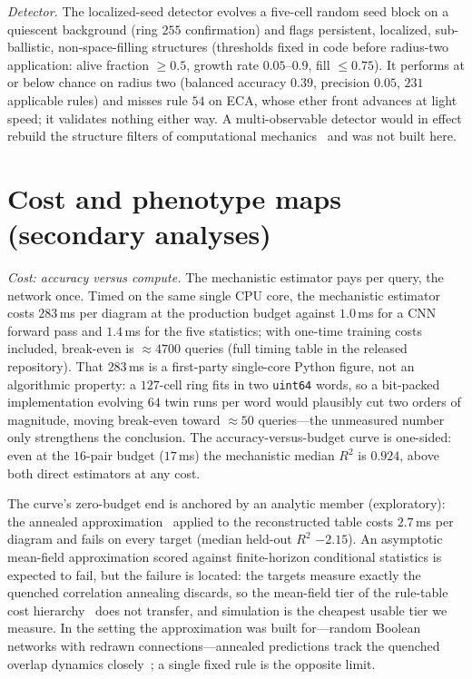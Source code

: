 \documentclass[aip,cha,amsmath,amssymb,reprint,floatfix]{revtex4-2}
\newcommand{\rtwo}{$R^2$}
\begin{document}
\emph{Detector.} The localized-seed detector evolves a five-cell random seed
block on a
quiescent background (ring $255$ confirmation) and flags persistent, localized,
sub-ballistic, non-space-filling structures (thresholds fixed in code before
radius-two application: alive fraction $\ge0.5$, growth rate $0.05$--$0.9$,
fill $\le0.75$). It performs at or below chance on radius two (balanced
accuracy $0.39$, precision $0.05$, $231$ applicable rules) and misses rule
$54$ on ECA, whose ether front advances at light speed; it validates nothing
either way. A multi-observable detector would in effect rebuild the structure
filters of computational mechanics~\cite{shalizi2006} and was not built
here.

\section{Cost and phenotype maps (secondary analyses)}
\label{app:secondary}

\emph{Cost: accuracy versus compute.} The mechanistic estimator pays per
query, the network once. Timed on the same single CPU core, the mechanistic
estimator costs $283$\,ms per diagram at the production budget against
$1.0$\,ms for a CNN forward pass and $1.4$\,ms for the five statistics; with
one-time training costs included, break-even is $\approx4700$ queries (full
timing table in the released repository). That $283$\,ms is a first-party
single-core Python figure, not an algorithmic property: a $127$-cell ring
fits in two \texttt{uint64} words, so a bit-packed
implementation evolving $64$ twin runs per word would plausibly cut
two orders of magnitude, moving break-even toward $\approx50$ queries---the
unmeasured number only strengthens the conclusion. The
accuracy-versus-budget curve is one-sided: even at the $16$-pair budget
($17$\,ms) the mechanistic median \rtwo{} is $0.924$, above both direct
estimators at any cost.

The curve's zero-budget end is anchored by an analytic member (exploratory):
the annealed approximation~\cite{derridapomeau1986} applied to the
reconstructed table costs $2.7$\,ms per diagram and fails on every target
(median held-out \rtwo{} $-2.15$). An asymptotic mean-field approximation
scored against finite-horizon conditional statistics is expected to fail, but
the failure is located: the targets measure exactly the quenched correlation
annealing discards, so the mean-field tier of the rule-table cost
hierarchy~\cite{vispoel2026structure} does not transfer, and simulation is the
cheapest usable tier we measure. In the setting the approximation was built
for---random Boolean networks with redrawn connections---annealed predictions
track the quenched overlap dynamics closely~\cite{derridaweisbuch1986}; a
single fixed rule is the opposite limit.
\end{document}
